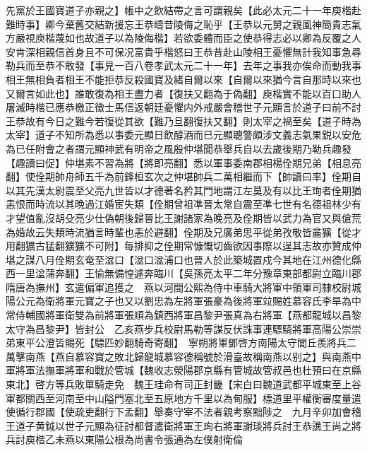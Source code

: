 先黨於王國寶道子亦親之】帳中之飲結帶之言可謂親矣【此必太元二十一年庾楷赴難時事】卿今棄舊交結新援忘王恭疇昔陵侮之恥乎【王恭以元舅之親風神簡貴志氣方嚴視庾楷蔑如也故道子以為陵侮楷】若欲委體而臣之使恭得志必以卿為反覆之人安肯深相親信首身且不可保况富貴乎楷怒曰王恭昔赴山陵相王憂懼無計我知事急尋勒兵而至恭不敢發【事見一百八卷孝武太元二十一年】去年之事我亦俟命而動我事相王無相負者相王不能拒恭反殺國寶及緒自爾以來【自爾以來猶今言自那時以來也又爾言如此也】誰敢復為相王盡力者【復扶又翻為于偽翻】庾楷實不能以百口助人屠滅時楷已應恭檄正徵士馬信返朝廷憂懼内外戒嚴會稽世子元顯言於道子曰前不討王恭故有今日之難今若復從其欲【難乃旦翻復扶又翻】則太宰之禍至矣【道子時為太宰】道子不知所為悉以事委元顯日飲醇酒而已元顯聰警頗涉文義志氣果鋭以安危為已任附會之者謂元顯神武有明帝之風殷仲堪聞恭舉兵自以去歲後期乃勒兵趣發【趣讀曰促】仲堪素不習為將【將即亮翻】悉以軍事委南郡相楊佺期兄弟【相息亮翻】使佺期帥舟師五千為前鋒桓玄次之仲堪帥兵二萬相繼而下【帥讀曰率】佺期自以其先漢太尉震至父亮九世皆以才德著名矜其門地謂江左莫及有以比王珣者佺期猶恚恨而時流以其晩過江婚宦失類【佺期曾祖凖晉太常自震至凖七世有名德祖林少有才望值亂沒胡殳亮少仕偽朝後歸晉比王謝諸家為晚亮及佺期皆以武力為官又與傖荒為婚故云失類時流猶言時輩也恚於避翻】佺期及兄廣弟思平從弟孜敬皆麄獷【從才用翻獷古猛翻獷獷不可附】每排抑之佺期常慷慨切齒欲因事際以逞其志故亦贊成仲堪之謀八月佺期玄奄至湓口【湓口湓浦口也晉人於此築城置戍今其地在江州德化縣西一里湓蒲奔翻】王愉無備惶遽奔臨川【吳孫亮太平二年分豫章東部都尉立臨川郡隋唐為撫州】玄遣偏軍追獲之　燕以河間公熙為侍中車騎大將軍中領軍司隸校尉城陽公元為衛將軍元寶之子也又以劉忠為左將軍張豪為後將軍竝賜姓慕容氏李旱為中常侍輔國將軍衛雙為前將軍張順為鎮西將軍昌黎尹張真為右將軍【燕都龍城以昌黎太守為昌黎尹】皆封公　乙亥燕步兵校尉馬勒等謀反伏誅事連驃騎將軍高陽公崇崇弟東平公澄皆賜死【驃匹妙翻騎奇寄翻】　寧朔將軍鄧啓方南陽太守閭丘羨將兵二萬擊南燕【燕自慕容寶之敗北歸龍城慕容德稱號於滑臺故稱南燕以别之】與南燕中軍將軍法撫軍將軍和戰於管城【魏收志滎陽郡京縣有管城故管叔邑也杜預曰在京縣東北】啓方等兵敗單騎走免　魏王珪命有司正封畿【宋白曰魏道武都平城東至上谷軍都關西至河南至中山隘門塞北至五原地方千里以為甸服】標道里平權衡審度量遣使循行郡國【使疏吏翻行下孟翻】舉奏守宰不法者親考察黜陟之　九月辛卯加會稽王道子黄鉞以世子元顯為征討都督遣衛將軍王珣右將軍謝琰將兵討王恭譙王尚之將兵討庾楷乙未燕以東陽公根為尚書令張通為左僕射衛倫

